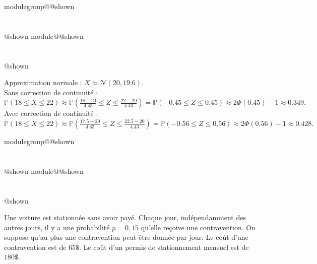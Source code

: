 \documentclass{Evaluation}
\makeatletter
\newcommand{\currentmodulekey}{}
\newcommand{\currentmoduletitle}{}
\newcommand{\currentgroupkey}{}
\newcommand{\currentgrouptitle}{}
\newcommand{\showmoduleifneeded}{%
  \ifx\currentgroupkey\empty\else
    \expandafter\ifx\csname modulegroup@\currentgroupkey @shown\endcsname\relax
      \section*{\currentgrouptitle}%
      \expandafter\gdef\csname modulegroup@\currentgroupkey @shown\endcsname{1}%
    \fi
  \fi
  \expandafter\ifx\csname module@\currentmodulekey @shown\endcsname\relax
    \section*{\currentmoduletitle}%
    \expandafter\gdef\csname module@\currentmodulekey @shown\endcsname{1}%
  \fi
}
\newenvironment{A25}{\showmoduleifneeded}{}
\newenvironment{H26}{\showmoduleifneeded}{}
\makeatother
\begin{document}
\begin{questions}
\begin{A25}
\begin{parts}
    \begin{solution}
        
    
    Approximation normale : $X \approx \mathcal{N}(20, 19.6)$. \\
    Sans correction de continuité : \\
    $\mathbb{P}(18 \leq X \leq 22) \approx \mathbb{P}\!\left(\frac{18-20}{4.43} \leq Z \leq \frac{22-20}{4.43}\right) = \mathbb{P}(-0.45 \leq Z \leq 0.45)\approx 2\Phi(0.45)-1 \approx 0.349.$ \\
    Avec correction de continuité : \\
    $\mathbb{P}(18 \leq X \leq 22) \approx \mathbb{P}\!\left(\frac{17.5-20}{4.43} \leq Z \leq \frac{22.5-20}{4.43}\right) = \mathbb{P}(-0.56 \leq Z \leq 0.56)\approx 2\Phi(0.56)-1 \approx 0.428.$
    \end{solution}
\end{parts}
\end{A25}

\begin{H26}
\question {} %

Une voiture est stationnée sans avoir payé. Chaque jour, indépendamment des autres jours, il y a une probabilité \(p=0{,}15\) qu’elle reçoive une contravention.
On suppose qu’au plus une contravention peut être donnée par jour.
Le coût d’une contravention est de \(65\$\). Le coût d’un permis de stationnement mensuel est de \(180\$\).

\end{H26}
\end{questions}
\end{document}
